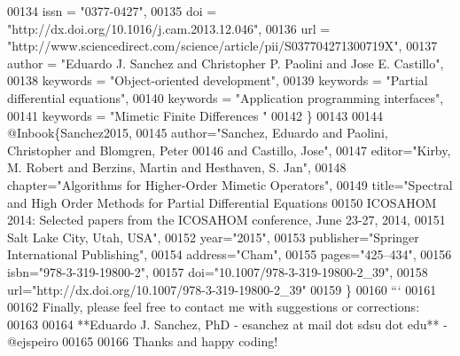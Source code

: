 \begin{DoxyCode}
00134   issn = "0377-0427",
00135   doi = "http://dx.doi.org/10.1016/j.cam.2013.12.046",
00136   url = "http://www.sciencedirect.com/science/article/pii/S037704271300719X",
00137   author = "Eduardo J. Sanchez and Christopher P. Paolini and Jose E. Castillo",
00138   keywords = "Object-oriented development",
00139   keywords = "Partial differential equations",
00140   keywords = "Application programming interfaces",
00141   keywords = "Mimetic Finite Differences "
00142 \}
00143 
00144 @Inbook\{Sanchez2015,
00145   author="Sanchez, Eduardo and Paolini, Christopher and Blomgren, Peter
00146 and Castillo, Jose",
00147   editor="Kirby, M. Robert and Berzins, Martin and Hesthaven, S. Jan",
00148   chapter="Algorithms for Higher-Order Mimetic Operators",
00149   title="Spectral and High Order Methods for Partial Differential Equations
00150 ICOSAHOM 2014: Selected papers from the ICOSAHOM conference, June 23-27, 2014,
00151 Salt Lake City, Utah, USA",
00152   year="2015",
00153   publisher="Springer International Publishing",
00154   address="Cham",
00155   pages="425--434",
00156   isbn="978-3-319-19800-2",
00157   doi="10.1007/978-3-319-19800-2\_39",
00158   url="http://dx.doi.org/10.1007/978-3-319-19800-2\_39"
00159 \}
00160 ```
00161 
00162 Finally, please feel free to contact me with suggestions or corrections:
00163 
00164 **Eduardo J. Sanchez, PhD - esanchez at mail dot sdsu dot edu** - @ejspeiro
00165 
00166 Thanks and happy coding!
\end{DoxyCode}
